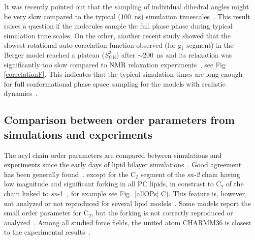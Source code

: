 \documentclass[aps,prl,superscriptaddress,twocolumn]{revtex4}
\begin{document}
It was recently pointed out that the sampling of individual dihedral angles might be very
slow compared to the typical (100~ns) simulation timescales~\cite{vogel12}.
This result raises a question if the molecules sample the full phase phase
during typical simulation time scales. On the other, another recent study showed
that the slowest rotational auto-correlation function observed (for g$_1$ segment) 
in the Berger model reached a plateau ($S_\mathrm{CH}^2$) after $\sim$200~ns
and its relaxation was significantly too slow compared to NMR relaxation experiments~\cite{ferreira15},
see Fig \ref{correlationF}. 
This indicates that the typical simulation times are long enough for full conformational 
phase space sampling for the models with realistic dynamics~\cite{ferreira15}.



\subsection{Comparison between order parameters from simulations and experiments}

The acyl chain order parameters are compared between simulations and experiments since the early days of lipid bilayer simulations~\cite{ploeg82,egberts88,stouch93,egberts94,essex94,robinson94,hyvonen95,kothekar96,tieleman96,shinoda97,berger97,tieleman97,klauda08b}. 
Good agreement has been generally found~\cite{berger97,hogberg08,poger10,ulmschneider09,kukol09,chiu09,klauda10,dickson12,jambeck12,chowdhary13,maciejewski14,tjornhammar14,dickson14,lee14}.
except for the C$_2$ segment of the {\it sn-2} chain having low magnitude and significant forking in all PC lipids, in constrast to C$_2$ of the chain linked to
{\it sn}-1~\cite{seelig74,seelig75,gross97,dvinskikh05a,ferreira13}, for example see Fig.~\ref{allOPs} C). 
This feature is, however, not analyzed or not reproduced for several lipid models~\cite{hogberg08,siu08,chiu09,kukol09,ulmschneider09,jambeck12,dickson12,chowdhary13,tjornhammar14,maciejewski14}.
Some models report the small order parameter for C$_2$,  but the forking is not correctly reproduced 
or analyzed~\cite{siu08,klauda10,chowdhary13,dickson14}.
Among all studied force fields, the united atom CHARMM36 is closest to the experimental results~\cite{lee14}.
\end{document}
